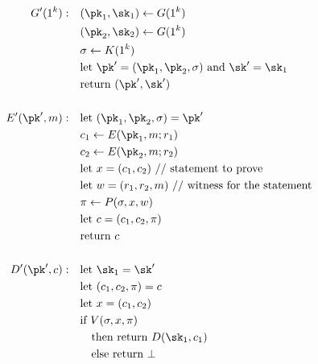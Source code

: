     \begin{align*}
        G'(1^k):\quad    & (\pk_1,\sk_1) \leftarrow G(1^k)                         \\
                         & (\pk_2,\sk_2) \leftarrow G(1^k)                         \\
                         & \sigma \leftarrow K(1^k)                                \\
                         & \text{let $\pk'=(\pk_1,\pk_2,\sigma)$ and $\sk'=\sk_1$} \\
                         & \text{return $(\pk',\sk')$}                             \\
                         &                                                         \\
        E'(\pk',m):\quad & \text{let $(\pk_1,\pk_2,\sigma)=\pk'$}                  \\
                         & c_1 \leftarrow E(\pk_1,m;r_1)                           \\
                         & c_2 \leftarrow E(\pk_2,m;r_2)                           \\
                         & \text{let $x=(c_1,c_2)$ // statement to prove}          \\
                         & \text{let $w=(r_1,r_2,m)$ // witness for the statement} \\
                         & \pi \leftarrow P(\sigma,x,w)                            \\
                         & \text{let $c=(c_1,c_2,\pi)$}                            \\
                         & \text{return $c$}                                       \\
                         &                                                         \\
        D'(\pk',c):\quad & \text{let $\sk_1=\sk'$}                                 \\
                         & \text{let $(c_1,c_2,\pi)=c$}                            \\
                         & \text{let $x=(c_1,c_2)$}                                \\
                         & \text{if $V(\sigma,x,\pi)$}                             \\
                         & \quad\text{then return $D(\sk_1,c_1)$}                  \\
                         & \quad\text{else return $\bot$}                          \\
    \end{align*}

